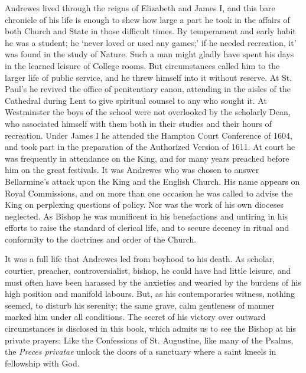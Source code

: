 Andrewes lived through the reigns of Elizabeth and James I, and this bare chronicle of his life is enough to shew how large a part he took in the affairs of both Church and State in those difficult times. By temperament and early habit he was a student; he ‘never loved or used any games;’ if he needed recreation, it’ was found in the study of Nature. Such a man might gladly have spent his days in the learned leisure of College rooms. But circumstances called him to the larger life of public service, and he threw himself into it without reserve. At St. Paul’s he revived the office of penitentiary canon, attending in the aisles of the Cathedral during Lent to give spiritual counsel to any who sought it. At Westminster the boys of the school were not overlooked by the scholarly Dean, who associated himself with them both in their studies and their hours of recreation. Under James I he attended the Hampton Court Conference of 1604, and took part in the preparation of the Authorized Version of 1611. At court he was frequently in attendance on the King, and for many years preached before him on the great festivals. It was Andrewes who was chosen to answer Bellarmine’s attack upon the King and the English Church. His name appears on Royal Commissions, and on more than one occasion he was called to advise the King on perplexing questions of policy. Nor was the work of his own dioceses neglected. As Bishop he was munificent in his benefactions and untiring in his efforts to raise the standard of clerical life, and to secure decency in ritual and conformity to the doctrines and order of the Church.

It was a full life that Andrewes led from boyhood to his death. As scholar, courtier, preacher, controversialist, bishop, he could have had little leisure, and must often have been harassed by the anxieties and wearied by the burdens of his high position and manifold labours. But, as his contemporaries witness, nothing seemed, to disturb his serenity; the same grave, calm gentleness of manner marked him under all conditions. The secret of his victory over outward circumstances is disclosed in this book, which admits us to see the Bishop at his private prayers: Like the Confessions of St. Augustine, like many of the Psalms, the \emph{Preces privatae} unlock the doors of a sanctuary where a saint kneels in fellowship with God.

